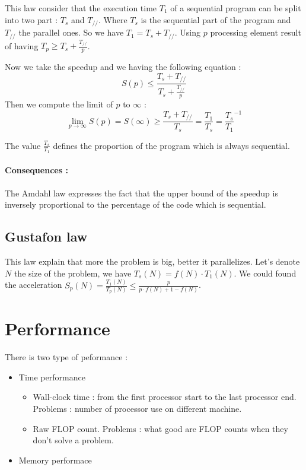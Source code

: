 \documentclass[11pt,a4paper]{report}
\begin{document}
This law consider that the execution time $T_1$ of a sequential program can be split into two part : $T_s$ and $T_{//}$. Where $T_s$ is the sequential part of the program and $T_{//}$ the parallel ones. So we have $T_1 = T_s + T_{//}$. Using $p$ processing element result of having $T_p \geq T_s + \frac{T_{//}}{p}$.

Now we take the speedup and we having the following equation :
$$
S(p) \leq \frac{T_s+T_{//}}{T_s + \frac{T_{//}}{p}}
$$
Then we compute the limit of $p$ to $\infty$ :
$$
\lim_{p\rightarrow \infty} S(p) = S(\infty) \geq \frac{T_s + T_{//}}{T_s} = \frac{T_1}{T_s} = \frac{T_s}{T_1}^{-1}
$$

The value $\frac{T_s}{T_1}$ defines the proportion of the program which is always sequential.

\paragraph*{Consequences :} The Amdahl law expresses the fact that the upper bound of the speedup is inversely proportional to the percentage of the code which is sequential.


\subsection{Gustafon law} %
\label{sub:Gustafon law}

This law explain that more the problem is big, better it parallelizes. Let's denote $N$ the size of the problem, we have $T_s(N) = f(N)\cdot T_1(N)$. We could found the acceleration $S_p(N)=\frac{T_1(N)}{T_p(N)} \leq \frac{p}{p \cdot f(N) +1 - f(N)}$.



\section{Performance} %
\label{sec:Performance}

There is two type of peformance :
\begin{itemize}
    \item Time performance
        \begin{itemize}
            \item Wall-clock time : from the first processor start to the last processor end. Problems : number of processor use on different machine.
            \item Raw FLOP count. Problems : what good are FLOP counts when they don't solve a problem.
        \end{itemize}
    \item Memory performace
\end{itemize}
\end{document}
